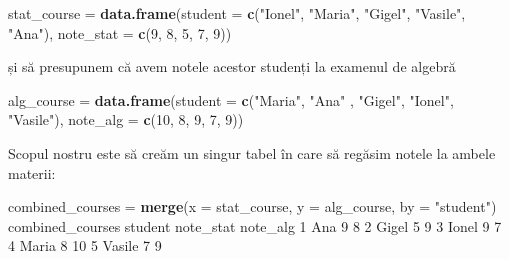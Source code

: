 \documentclass[]{article}
\newenvironment{Shaded}{\begin{snugshade}}{\end{snugshade}}
\newcommand{\KeywordTok}[1]{\textcolor[rgb]{0.13,0.29,0.53}{\textbf{#1}}}
\newcommand{\DataTypeTok}[1]{\textcolor[rgb]{0.13,0.29,0.53}{#1}}
\newcommand{\DecValTok}[1]{\textcolor[rgb]{0.00,0.00,0.81}{#1}}
\newcommand{\StringTok}[1]{\textcolor[rgb]{0.31,0.60,0.02}{#1}}
\newcommand{\NormalTok}[1]{#1}
\begin{document}
\begin{Shaded}
\begin{Highlighting}[]
\NormalTok{stat_course =}\StringTok{ }\KeywordTok{data.frame}\NormalTok{(}\DataTypeTok{student =} \KeywordTok{c}\NormalTok{(}\StringTok{"Ionel"}\NormalTok{, }\StringTok{"Maria"}\NormalTok{, }\StringTok{"Gigel"}\NormalTok{, }\StringTok{"Vasile"}\NormalTok{, }\StringTok{"Ana"}\NormalTok{),}
                         \DataTypeTok{note_stat =} \KeywordTok{c}\NormalTok{(}\DecValTok{9}\NormalTok{, }\DecValTok{8}\NormalTok{, }\DecValTok{5}\NormalTok{, }\DecValTok{7}\NormalTok{, }\DecValTok{9}\NormalTok{)) }
\end{Highlighting}
\end{Shaded}

și să presupunem că avem notele acestor studenți la examenul de algebră

\begin{Shaded}
\begin{Highlighting}[]
\NormalTok{alg_course =}\StringTok{ }\KeywordTok{data.frame}\NormalTok{(}\DataTypeTok{student =} \KeywordTok{c}\NormalTok{(}\StringTok{"Maria"}\NormalTok{, }\StringTok{"Ana"}\NormalTok{ , }\StringTok{"Gigel"}\NormalTok{, }\StringTok{"Ionel"}\NormalTok{, }\StringTok{"Vasile"}\NormalTok{),}
                         \DataTypeTok{note_alg =} \KeywordTok{c}\NormalTok{(}\DecValTok{10}\NormalTok{, }\DecValTok{8}\NormalTok{, }\DecValTok{9}\NormalTok{, }\DecValTok{7}\NormalTok{, }\DecValTok{9}\NormalTok{)) }
\end{Highlighting}
\end{Shaded}

Scopul nostru este să creăm un singur tabel în care să regăsim notele la
ambele materii:

\begin{Shaded}
\begin{Highlighting}[]
\NormalTok{combined_courses =}\StringTok{ }\KeywordTok{merge}\NormalTok{(}\DataTypeTok{x =}\NormalTok{ stat_course, }
                         \DataTypeTok{y =}\NormalTok{ alg_course,}
                         \DataTypeTok{by =} \StringTok{"student"}\NormalTok{)}
\NormalTok{combined_courses}
\NormalTok{  student note_stat note_alg}
\DecValTok{1}\NormalTok{     Ana         }\DecValTok{9}        \DecValTok{8}
\DecValTok{2}\NormalTok{   Gigel         }\DecValTok{5}        \DecValTok{9}
\DecValTok{3}\NormalTok{   Ionel         }\DecValTok{9}        \DecValTok{7}
\DecValTok{4}\NormalTok{   Maria         }\DecValTok{8}       \DecValTok{10}
\DecValTok{5}\NormalTok{  Vasile         }\DecValTok{7}        \DecValTok{9}
\end{Highlighting}
\end{Shaded}
\end{document}
